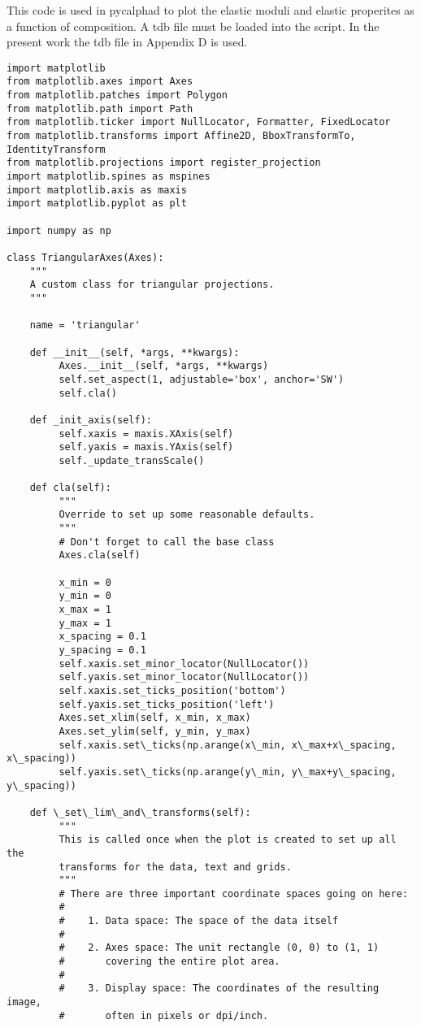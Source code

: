 
\noindent This code is used in pycalphad to plot the elastic moduli and elastic properites as a function of composition. A tdb file must be loaded into the script. In the present work the tdb file in Appendix D is used.
{\lstset{language=Python}
\footnotesize
\begin{lstlisting}
import matplotlib
from matplotlib.axes import Axes
from matplotlib.patches import Polygon
from matplotlib.path import Path
from matplotlib.ticker import NullLocator, Formatter, FixedLocator
from matplotlib.transforms import Affine2D, BboxTransformTo, IdentityTransform
from matplotlib.projections import register_projection
import matplotlib.spines as mspines
import matplotlib.axis as maxis
import matplotlib.pyplot as plt

import numpy as np

class TriangularAxes(Axes):
    """
    A custom class for triangular projections.
    """

    name = 'triangular'

    def __init__(self, *args, **kwargs):
         Axes.__init__(self, *args, **kwargs)
         self.set_aspect(1, adjustable='box', anchor='SW')
         self.cla()

    def _init_axis(self):
         self.xaxis = maxis.XAxis(self)
         self.yaxis = maxis.YAxis(self)
         self._update_transScale()

    def cla(self):
         """
         Override to set up some reasonable defaults.
         """
         # Don't forget to call the base class
         Axes.cla(self)

         x_min = 0
         y_min = 0
         x_max = 1
         y_max = 1
         x_spacing = 0.1
         y_spacing = 0.1
         self.xaxis.set_minor_locator(NullLocator())
         self.yaxis.set_minor_locator(NullLocator())
         self.xaxis.set_ticks_position('bottom')
         self.yaxis.set_ticks_position('left')
         Axes.set_xlim(self, x_min, x_max)
         Axes.set_ylim(self, y_min, y_max)
         self.xaxis.set\_ticks(np.arange(x\_min, x\_max+x\_spacing, x\_spacing))
         self.yaxis.set\_ticks(np.arange(y\_min, y\_max+y\_spacing, y\_spacing))

    def \_set\_lim\_and\_transforms(self):
         """
         This is called once when the plot is created to set up all the
         transforms for the data, text and grids.
         """
         # There are three important coordinate spaces going on here:
         #
         #    1. Data space: The space of the data itself
         #
         #    2. Axes space: The unit rectangle (0, 0) to (1, 1)
         #       covering the entire plot area.
         #
         #    3. Display space: The coordinates of the resulting image,
         #       often in pixels or dpi/inch.


\end{lstlisting}}
